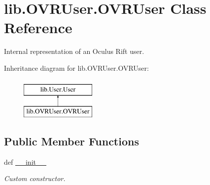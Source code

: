 \hypertarget{classlib_1_1OVRUser_1_1OVRUser}{\section{lib.\-O\-V\-R\-User.\-O\-V\-R\-User \-Class \-Reference}
\label{classlib_1_1OVRUser_1_1OVRUser}
}


\-Internal representation of an \-Oculus \-Rift user.  


\-Inheritance diagram for lib.\-O\-V\-R\-User.\-O\-V\-R\-User\-:\begin{figure}[H]
\begin{center}
\leavevmode
\includegraphics[height=2.000000cm]{classlib_1_1OVRUser_1_1OVRUser}
\end{center}
\end{figure}
\subsection*{\-Public \-Member \-Functions}
\begin{DoxyCompactItemize}
\item 
def \hyperlink{classlib_1_1OVRUser_1_1OVRUser_a5d1011dde798364977feacef6537a385}{\-\_\-\-\_\-init\-\_\-\-\_\-}
\begin{DoxyCompactList}\small\item\em \-Custom constructor. \end{DoxyCompactList}\end{DoxyCompactItemize}
